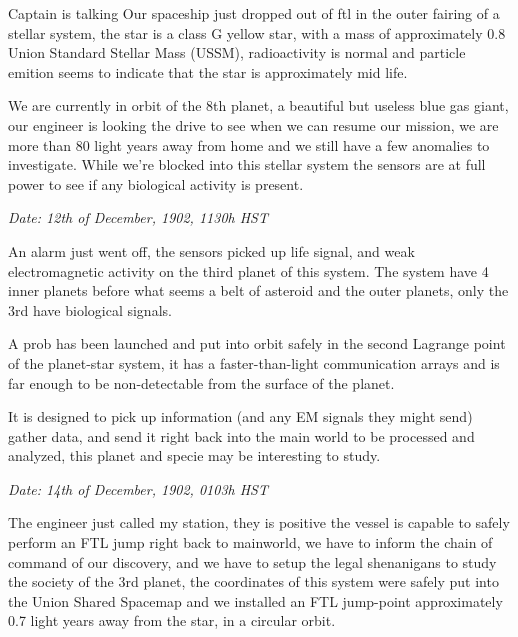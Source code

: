 \documentclass[hidelinks,12pt,a4paper]{book}
\begin{document}
Captain is talking\newline
Our spaceship just dropped out of \gls{ftl} in the outer fairing of a stellar system, 
the star is a class G yellow star, with a mass of approximately 0.8 Union Standard Stellar Mass (USSM), 
radioactivity is normal and particle emition seems to indicate that the star is approximately mid life.\par
\bigskip
We are currently in orbit of the 8th planet, 
a beautiful but useless blue gas giant, 
our engineer is looking the drive to see when we can resume our mission, 
we are more than 80 light years away from home and we still have a few anomalies to investigate. 
While we're blocked into this stellar system the sensors are at full power to see if any biological activity is present.\newline

\textit{Date: 12th of December, 1902, 1130h HST}\par

An alarm just went off, 
the sensors picked up life signal, and weak electromagnetic activity on the third planet of this system. 
The system have 4 inner planets before what seems a belt of asteroid and the outer planets, 
only the 3rd have biological signals. \par
\bigskip

A prob has been launched and put into orbit safely in the second Lagrange point of the planet-star system,
 it has a faster-than-light communication arrays and is far enough to be non-detectable from the surface of the planet. \par
\bigskip
It is designed to pick up information 
(and any EM signals they might send) gather data, and send it right back into the main world to be processed and analyzed, 
this planet and specie may be interesting to study.\par
\bigskip

\textit{Date: 14th of December, 1902, 0103h HST}\par

The engineer just called my station, 
they is positive the vessel is capable to safely perform an FTL jump right back to mainworld, 
we have to inform the chain of command of our discovery, and we have to setup the legal shenanigans 
to study the society of the 3rd planet, the coordinates of this system were safely put into the Union Shared Spacemap 
and we installed an FTL jump-point approximately 0.7 light years away from the star, in a circular orbit.\par
\bigskip
\end{document}
